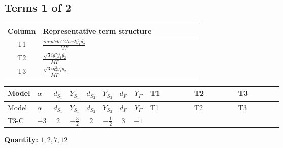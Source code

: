 \documentclass[8pt]{article}
\begin{document}
\begin{landscape}
\subsection*{Terms 1 of 2}
\begin{center}
\begin{tabular}{@{}c >{\raggedright\arraybackslash}p{0.82\linewidth}@{}}
\toprule
Column & Representative term structure \\
\midrule
T1 & \(\displaystyle \frac{i lambda12Inv2 \overline{y_{1}} \overline{y_{2}}}{MF}\) \\
\midrule
T2 & \(\displaystyle \frac{\sqrt{3} i g_{1}^{2} \overline{y_{1}} \overline{y_{2}}}{MF}\) \\
\midrule
T3 & \(\displaystyle \frac{\sqrt{3} i g_{2}^{2} \overline{y_{1}} \overline{y_{2}}}{MF}\) \\
\midrule
\bottomrule
\end{tabular}
\end{center}
\smallskip
\tiny
\begin{longtable}{@{}llcccccc >{\raggedright\arraybackslash}p{0.21\linewidth} >{\raggedright\arraybackslash}p{0.21\linewidth} >{\raggedright\arraybackslash}p{0.21\linewidth}@{}}
\toprule
Model & $\alpha$ & $d_{S_1}$ & $Y_{S_1}$ & $d_{S_2}$ & $Y_{S_2}$ & $d_F$ & $Y_F$ & T1 & T2 & T3 \\
\midrule
\endfirsthead
\toprule
Model & $\alpha$ & $d_{S_1}$ & $Y_{S_1}$ & $d_{S_2}$ & $Y_{S_2}$ & $d_F$ & $Y_F$ & T1 & T2 & T3 \\
\midrule
\endhead
T3-C & $-3$ & $2$ & $-\frac{3}{2}$ & $2$ & $-\frac{1}{2}$ & $3$ & $-1$ & \scriptsize\adjustbox{max width=\linewidth}{$\begin{gathered} \frac{i lambda12Inv2 \overline{y_{1}} \overline{y_{2}}}{6 MF}\end{gathered}$} & \scriptsize\adjustbox{max width=\linewidth}{$\begin{gathered} \frac{\sqrt{3} i g_{1}^{2} \overline{y_{1}} \overline{y_{2}}}{4 MF}\end{gathered}$} & \scriptsize\adjustbox{max width=\linewidth}{$\begin{gathered} \frac{\sqrt{3} i g_{2}^{2} \overline{y_{1}} \overline{y_{2}}}{8 MF}\end{gathered}$} \\
\midrule
\bottomrule
\end{longtable}
\clearpage
\noindent\textbf{Quantity: }$\mathrm{1,2,7,12}$\par\smallskip

\end{landscape}
\end{document}
